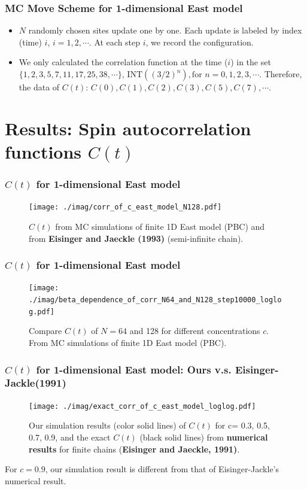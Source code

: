 \documentclass[8pt]{beamer}
\begin{document}
\begin{frame}
	\frametitle{MC Move Scheme for 1-dimensional East model}
	\begin{itemize}
        \item $N$ randomly chosen sites update one by one. Each update is labeled by index (time) $i$, $i=1,2,\cdots$. At each step $i$, we record the configuration.  
        \item We only calculated the correlation function at the time ($i$) in the set $\{ 1, 2, 3, 5, 7, 11, 17, 25, 38,\cdots\}$, $\text{INT}((3/2)^n), \text{for } n= 0,1,2,3,\cdots$. Therefore, the data of $C(t)$: $C(0), C(1), C(2), C(3), C(5),C(7),\cdots.$ 
    \end{itemize}
\end{frame}

\section{Results: Spin autocorrelation functions $C(t)$}
\begin{frame}
	\frametitle{$C(t)$ for 1-dimensional East model}
	\begin{figure}
		\centering
		\texttt{[image: ./imag/corr\_of\_c\_east\_model\_N128.pdf]}
		\setlength{\abovecaptionskip}{0pt}
		\caption{$C(t)$ from MC simulations of finite 1D East model (PBC) and from \textbf{Eisinger and Jaeckle (1993)} (semi-infinite chain). }
	\end{figure}
\end{frame}

\begin{frame}
	\frametitle{$C(t)$ for 1-dimensional East model}
	\begin{figure}
		\centering
		\texttt{[image: ./imag/beta\_dependence\_of\_corr\_N64\_and\_N128\_step10000\_loglog.pdf]}
		\setlength{\abovecaptionskip}{0pt}
		\caption{Compare $C(t)$ of $N=64$ and 128 for different concentrations $c$. From MC simulations of finite 1D East model (PBC).}
	\end{figure}
\end{frame}

\begin{frame}
	\frametitle{$C(t)$ for 1-dimensional East model: Ours v.s.  Eisinger-Jackle(1991)}
	\begin{figure}
		\centering
		\texttt{[image: ./imag/exact\_corr\_of\_c\_east\_model\_loglog.pdf]}
		\setlength{\abovecaptionskip}{0pt}
		\caption{Our simulation results (color solid lines) of $C(t)$ for c= 0.3, 0.5, 0.7, 0.9, and the exact $C(t)$ (black solid lines) from \textbf{numerical results} for finite chains (\textbf{Eisinger and Jaeckle, 1991)}.}
	\end{figure}
For $c=0.9$, our simulation result is different from that of Eisinger-Jackle's numerical result.  
\end{frame}
\end{document}

